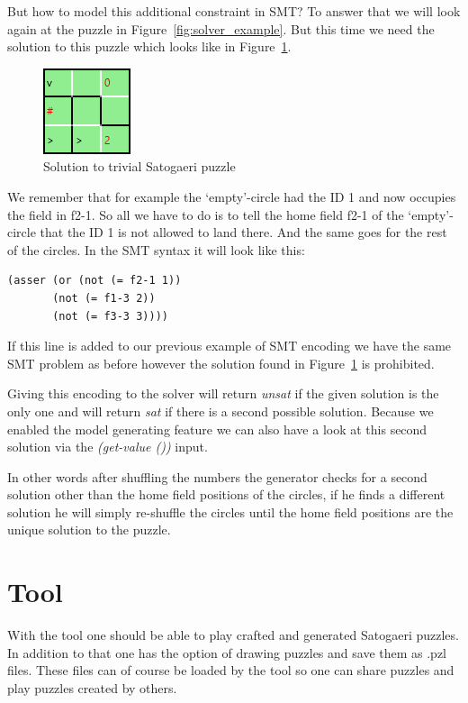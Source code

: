 But how to model this additional constraint in SMT? To answer that we will look again at the puzzle in Figure~\ref{fig:solver_example}. But this time we need the solution to this puzzle which looks like in Figure~\ref{fig:solver_example_solution}.
\begin{figure}
  \centering
  \includegraphics[scale=1]{Pictures/solver_example_solution.png} 
  \caption{Solution to trivial Satogaeri puzzle}
  \label{fig:solver_example_solution}
\end{figure}
We remember that for example the `empty'-circle had the ID 1 and now occupies the field in f2-1. So all we have to do is to tell the home field f2-1 of the `empty'-circle that the ID 1 is not allowed to land there. And the same goes for the rest of the circles. In the SMT syntax it will look like this:
\begin{lstlisting}
(asser (or (not (= f2-1 1)) 
	   (not (= f1-3 2)) 
	   (not (= f3-3 3))))
\end{lstlisting}
If this line is added to our previous example of SMT encoding we have the same SMT problem as before however the solution found in Figure~\ref{fig:solver_example_solution} is prohibited.

Giving this encoding to the solver will return \emph{unsat} if the given solution is the only one and will return \emph{sat} if there is a second possible solution. Because we enabled the model generating feature we can also have a look at this second solution via the \emph{(get-value ())} input.

In other words after shuffling the numbers the generator checks for a second solution other than the home field positions of the circles, if he finds a different solution he will simply re-shuffle the circles until the home field positions are the unique solution to the puzzle.

\chapter{Tool} \label{The Tool}
With the tool one should be able to play crafted and generated Satogaeri puzzles. In addition to that one has the option of drawing puzzles and save them as .pzl files. These files can of course be loaded by the tool so one can share puzzles and play puzzles created by others.

